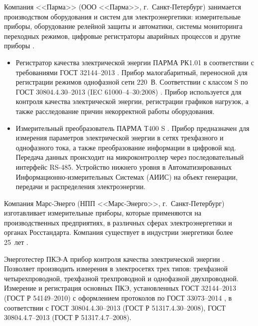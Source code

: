 Компания <<Парма>> (ООО <<Парма>>, г.~Санкт-Петербург) занимается производством оборудования и систем для электроэнергетики: измерительные приборы, оборудование релейной защиты и автоматики, системы мониторинга переходных режимов, цифровые регистраторы аварийных процессов и другие приборы \cite{parma}. 

\begin{itemize}
	\item Регистратор качества электрической энергии ПАРМА РК1.01 \cite{parma2} в соответствии с требованиями ГОСТ 32144–2013 \cite{ГОСТ32144-2013}. 
	Прибор малогабаритный, переносной для регистрации режимов однофазной сети $220$~В. Соответствии с классом S по ГОСТ 30804.4.30–2013 (IEC 61000–4–30:2008) \cite{ГОСТ30804.4.30-2013}. Прибор используется для контроля качества электрической энергии, регистрации графиков нагрузок, а также расследование причин некорректной работы оборудования.
	 
	\item Измерительный преобразователь ПАРМА Т400 S \cite{parma1}.
	Прибор предназначен для измерения параметров электрической энергии в сетях трехфазного и однофазного тока, а также преобразование информации в цифровой код. Передача данных происходит на микроконтроллер через последовательный интерфейс RS-485. Устройство нижнего уровня в Автоматизированных Информационно-измерительных Системах (АИИС) на объект генерации, передачи и распределения электроэнергии.
\end{itemize}

Компания Марс-Энерго (НПП <<Марс-Энерго>>, г.~Санкт-Петербург) изготавливает измерительные приборы, которые применяются на производственных предприятиях, в различных сферах электроэнергетики и органах Росстандарта. Компания существует в индустрии энергетики более 25~лет \cite{Марс-Энерго}.

Энерготестер ПКЭ-А прибор контроля качества электрической энергии \cite{энерготестер}.
Позволяет производить измерения в электросетях трех типов: трехфазной четырехпроводной, трехфазной трехпроводной и однофазной двухпроводной. Измерение и регистрация основных ПКЭ, установленных ГОСТ 32144–2013 \cite{ГОСТ32144-2013} (ГОСТ Р 54149–2010) с оформлением протоколов по ГОСТ 33073–2014 \cite{ГОСТ33073-2014}, в соответствии с ГОСТ 30804.4.30–2013 \cite{ГОСТ30804.4.30-2013} (ГОСТ Р 51317.4.30–2008), ГОСТ 30804.4.7–2013 \cite{ГОСТ30804.4.7-2013} (ГОСТ Р 51317.4.7–2008). 

